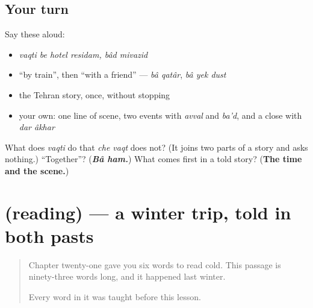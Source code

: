 \subsection*{Your turn}
Say these aloud:

\begin{itemize}
\raggedright
  \item \emph{vaqti be hotel residam, bâd mivazid}
  \item \textquotedblleft{}by train\textquotedblright{}, then \textquotedblleft{}with a friend\textquotedblright{} — \emph{bâ qatâr}, \emph{bâ yek dust}
  \item the Tehran story, once, without stopping
  \item your own: one line of scene, two events with \emph{avval} and \emph{ba'd}, and a close with \emph{dar âkhar}
\end{itemize}

\begin{tcolorbox}[breakable,colback=teal!4,colframe=teal!35!black,title={Before you move on}]
What does \emph{vaqti} do that \emph{che vaqt} does not? (It joins two parts of a story and asks nothing.) \textquotedblleft{}Together\textquotedblright{}? (\emph{\textbf{Bâ ham.}}) What comes first in a told story? (\textbf{The time and the scene.})
\end{tcolorbox}
\section[(reading)]{(reading) — a winter trip, told in both pasts}

\label{lesson:FA-C291-khandani}



\begin{quote}
Chapter twenty-one gave you six words to read cold. This passage is ninety-three words long, and it happened last winter.

Every word in it was taught before this lesson.
\end{quote}

